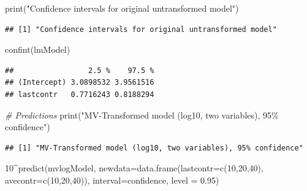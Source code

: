 \documentclass[
]{article}
\newenvironment{Shaded}{\begin{snugshade}}{\end{snugshade}}
\newcommand{\AttributeTok}[1]{\textcolor[rgb]{0.77,0.63,0.00}{#1}}
\newcommand{\CommentTok}[1]{\textcolor[rgb]{0.56,0.35,0.01}{\textit{#1}}}
\newcommand{\DecValTok}[1]{\textcolor[rgb]{0.00,0.00,0.81}{#1}}
\newcommand{\FloatTok}[1]{\textcolor[rgb]{0.00,0.00,0.81}{#1}}
\newcommand{\FunctionTok}[1]{\textcolor[rgb]{0.00,0.00,0.00}{#1}}
\newcommand{\NormalTok}[1]{#1}
\newcommand{\SpecialCharTok}[1]{\textcolor[rgb]{0.00,0.00,0.00}{#1}}
\newcommand{\StringTok}[1]{\textcolor[rgb]{0.31,0.60,0.02}{#1}}
\begin{document}
\begin{Shaded}
\begin{Highlighting}[]
\FunctionTok{print}\NormalTok{(}\StringTok{"Confidence intervals for original untransformed model"}\NormalTok{)}
\end{Highlighting}
\end{Shaded}

\begin{verbatim}
## [1] "Confidence intervals for original untransformed model"
\end{verbatim}

\begin{Shaded}
\begin{Highlighting}[]
\FunctionTok{confint}\NormalTok{(lmModel)}
\end{Highlighting}
\end{Shaded}

\begin{verbatim}
##                 2.5 %    97.5 %
## (Intercept) 3.0898532 3.9561516
## lastcontr   0.7716243 0.8188294
\end{verbatim}

\begin{Shaded}
\begin{Highlighting}[]
\CommentTok{\# Predictions}
\FunctionTok{print}\NormalTok{(}\StringTok{"MV{-}Transformed model (log10, two variables), 95\% confidence"}\NormalTok{)}
\end{Highlighting}
\end{Shaded}

\begin{verbatim}
## [1] "MV-Transformed model (log10, two variables), 95% confidence"
\end{verbatim}

\begin{Shaded}
\begin{Highlighting}[]
\DecValTok{10}\SpecialCharTok{\^{}}\FunctionTok{predict}\NormalTok{(mvlogModel,}
        \AttributeTok{newdata=}\FunctionTok{data.frame}\NormalTok{(}\AttributeTok{lastcontr=}\FunctionTok{c}\NormalTok{(}\DecValTok{10}\NormalTok{,}\DecValTok{20}\NormalTok{,}\DecValTok{40}\NormalTok{), }\AttributeTok{avecontr=}\FunctionTok{c}\NormalTok{(}\DecValTok{10}\NormalTok{,}\DecValTok{20}\NormalTok{,}\DecValTok{40}\NormalTok{)),}
        \AttributeTok{interval=}\StringTok{\textquotesingle{}confidence\textquotesingle{}}\NormalTok{,}
        \AttributeTok{level =} \FloatTok{0.95}\NormalTok{)}
\end{Highlighting}
\end{Shaded}
\end{document}

